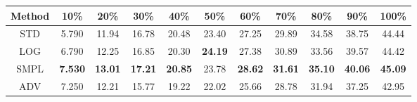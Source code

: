 \documentclass{standalone}
\begin{document}
\begin{tabular}{c|cccccccccc}
      \toprule
      Method & 10\% & 20\% & 30\% & 40\% & 50\% & 60\% & 70\% & 80\% & 90\% & 100\% \\
      \midrule
STD & 5.790 & 11.94 & 16.78 & 20.48 & 23.40 & 27.25 & 29.89 & 34.58 & 38.75 & 44.44\\
LOG & 6.790 & 12.25 & 16.85 & 20.30 & \textbf{24.19} & 27.38 & 30.89 & 33.56 & 39.57 & 44.42\\
SMPL & \textbf{7.530} & \textbf{13.01} & \textbf{17.21} & \textbf{20.85} & 23.78 & \textbf{28.62} & \textbf{31.61} & \textbf{35.10} & \textbf{40.06} & \textbf{45.09}\\
ADV & 7.250 & 12.21 & 15.77 & 19.22 & 22.02 & 25.66 & 28.78 & 31.94 & 37.25 & 42.95\\
  \bottomrule
\end{tabular}
\end{document}
